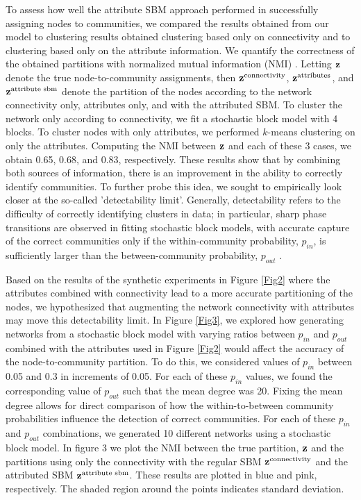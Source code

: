 To assess how well the attribute SBM approach performed in successfully assigning nodes to communities, we compared the results obtained from our model to clustering results obtained clustering based only on connectivity and to clustering based only on the attribute information. We quantify the correctness of the obtained partitions with normalized mutual information (NMI) \cite{commdeccompare}. Letting ${\bf z}$ denote the true node-to-community assignments, then ${\bf z}^{\text{connectivity}}$, ${\bf z}^{\text{attributes}}$, and ${\bf z}^{\text{attribute sbm}}$ denote the partition of the nodes according to the network connectivity only, attributes only, and with the attributed SBM. To cluster the network only according to connectivity, we fit a stochastic block model with 4 blocks. To cluster nodes with only attributes, we performed $k$-means clustering on only the attributes. Computing the NMI between ${\bf z}$ and each of these 3 cases, we obtain 0.65, 0.68, and 0.83, respectively. 
These results show that by combining both sources of information, there is an improvement in the ability to correctly identify communities. To further probe this idea, we sought to empirically look closer at the so-called 'detectability limit'. Generally, detectability refers to the difficulty of correctly identifying clusters in data; in particular, sharp phase transitions are observed in fitting stochastic block models, with accurate capture of the correct communities only if the within-community probability, $p_{in}$, is sufficiently larger than the between-community probability, $p_{out}$ \cite{decelle,taylor}. 

Based on the results of the synthetic experiments in Figure \ref{Fig2} where the attributes combined with connectivity lead to a more accurate partitioning of the nodes, we hypothesized that augmenting the network connectivity with attributes may move this detectability limit. In Figure \ref{Fig3}, we explored how generating networks from a stochastic block model with varying ratios between $p_{in}$ and $p_{out}$ combined with the attributes used in Figure \ref{Fig2} would affect the accuracy of the node-to-community partition. To do this, we considered values of $p_{in}$ between 0.05 and 0.3 in increments of 0.05. For each of these $p_{in}$ values, we found the corresponding value of $p_{out}$ such that the mean degree was 20. Fixing the mean degree allows for direct comparison of how the within-to-between community probabilities influence the detection of correct communities. For each of these $p_{in}$ and $p_{out}$ combinations, we generated 10 different networks using a stochastic block model. In figure 3 we plot the NMI between the true partition, ${\bf z}$ and the partitions using only the connectivity with the regular SBM ${\bf z}^{\text{connectivity}}$ and the attributed SBM ${\bf z}^{\text{attribute sbm}}$. These results are plotted in blue and pink, respectively. The shaded region around the points indicates standard deviation. 

